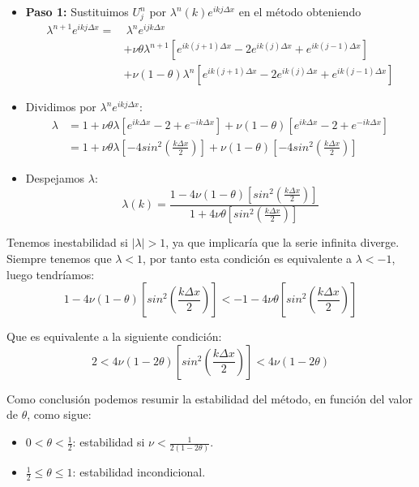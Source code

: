 \documentclass[spanish]{mathnotes}
\begin{document}
			\begin{itemize}
				\item \textbf{Paso 1: } Sustituimos $U_j^n$ por $\lambda^n(k)e^{ikj\Delta x}$ en el método obteniendo
				\begin{align*}
					\lambda^{n+1}e^{ikj\Delta x} =&\  \lambda^ne^{ijk\Delta x}\\
					&+\nu\theta\lambda^{n+1}\left[e^{ik(j+1)\Delta x}-2e^{ik(j)\Delta x}+e^{ik(j-1)\Delta x}\right]\\
					&+\nu(1-\theta)\lambda^{n}\left[e^{ik(j+1)\Delta x}-2e^{ik(j)\Delta x}+e^{ik(j-1)\Delta x}\right]
				\end{align*}
				
				\item Dividimos por $\lambda^ne^{ikj\Delta x}$:
				\begin{align*}
					\lambda &= 1 + \nu\theta\lambda\left[e^{ik\Delta x}-2+e^{-ik\Delta x}\right] + \nu(1-\theta)\left[e^{ik\Delta x}-2+e^{-ik\Delta x}\right]\\
					&= 1 + \nu\theta\lambda\left[-4sin^2\left(\frac{k\Delta x}{2}\right)\right] + \nu(1-\theta)\left[-4sin^2\left(\frac{k\Delta x}{2}\right)\right]
				\end{align*}
				
				
				\item Despejamos $\lambda$:
				$$\lambda(k) = \frac{1-4\nu(1-\theta)\left[sin^2\left(\frac{k\Delta x}{2}\right)\right]}{1+4\nu \theta\left[sin^2\left(\frac{k\Delta x}{2}\right)\right]}$$
			\end{itemize}
			
			Tenemos inestabilidad si $\left|\lambda\right|>1$, ya que implicaría que la serie infinita diverge. Siempre tenemos que $\lambda < 1$, por tanto esta condición es equivalente a $\lambda < -1$, luego tendríamos:
			$$1-4\nu(1-\theta)\left[sin^2\left(\frac{k\Delta x}{2}\right)\right] < -1-4\nu \theta\left[sin^2\left(\frac{k\Delta x}{2}\right)\right]$$
			
			Que es equivalente a la siguiente condición:
			$$2<4\nu(1-2\theta)\left[sin^2\left(\frac{k\Delta x}{2}\right)\right] < 4\nu(1-2\theta)$$
			
			Como conclusión podemos resumir la estabilidad del método, en función del valor de $\theta$, como sigue:
			\begin{itemize}
				\item $0<\theta < \frac{1}{2}$: estabilidad si $\nu < \frac{1}{2(1-2\theta)}$.
				\item $\frac{1}{2}\le \theta \le 1$: estabilidad incondicional. 
			\end{itemize}
			
\end{document}
